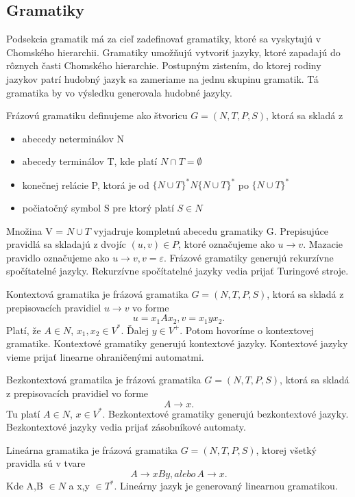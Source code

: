\subsection{Gramatiky}
Podsekcia gramatik má za cieľ zadefinovať gramatiky, ktoré sa vyskytujú v Chomského hierarchii. Gramatiky umožňujú vytvoriť jazyky, ktoré zapadajú do rôznych časti Chomského hierarchie. Postupným zistením, do ktorej rodiny jazykov patrí hudobný jazyk sa zameriame na jednu skupinu gramatik. Tá gramatika by vo výsledku generovala hudobné jazyky.

\begin{definition}
\label{def:frazgram}
Frázovú gramatiku definujeme ako štvoricu $G = (N,T,P,S)$, ktorá sa skladá z 
\begin{itemize}\itemsep0.05em
    \item abecedy neterminálov N
    \item abecedy terminálov T, kde platí $N \cap T = \emptyset$
    \item konečnej relácie P, ktorá je od $\{N \cup T\}^*N\{N \cup T\}^*$ po $\{N \cup T\}^*$
    \item počiatočný symbol S pre ktorý platí $S \in N$
\end{itemize}

Množina V = $N \cup T$ vyjadruje kompletnú abecedu gramatiky G. Prepisujúce pravidlá sa skladajú z dvojíc $(u,v) \in P$, ktoré označujeme ako $u \rightarrow v$. Mazacie pravidlo označujeme ako $u \rightarrow v, v = \varepsilon$. Frázové gramatiky generujú rekurzívne spočítatelné jazyky. Rekurzívne spočítatelné jazyky vedia prijať Turingové stroje.
\end{definition}

\begin{definition}
\label{def:kontextgram}
Kontextová gramatika je frázová gramatika $G = (N,T,P,S)$, ktorá sa skladá z prepisovacích pravidiel $u \rightarrow v$ vo forme $$u = x_1Ax_2, v = x_1yx_2.$$ Platí, že $A \in N$, $x_1, x_2 \in V^*$. Ďalej $y \in V^+$. Potom hovoríme o kontextovej gramatike. Kontextové gramatiky generujú kontextové jazyky. Kontextové jazyky vieme prijať linearne ohraničenými automatmi.
\end{definition}

\begin{definition}
\label{def:nonkontextgram}
Bezkontextová gramatika je frázová gramatika $G = (N,T,P,S)$, ktorá sa skladá z prepisovacích pravidiel vo forme $$A \rightarrow x.$$ Tu platí $A \in N$, $x \in V^*$. Bezkontextové gramatiky generujú bezkontextové jazyky. Bezkontextové jazyky vedia prijať zásobníkové automaty.
\end{definition}
\begin{definition}
\label{def:lingram}
Lineárna gramatika je frázová gramatika $G = (N,T,P,S)$, ktorej všetký pravidla sú v tvare $$A \rightarrow xBy, alebo \, A \rightarrow x.$$ Kde A,B $ \in N$ a x,y $ \in T^*$. Lineárny jazyk je generovaný linearnou gramatikou.
\end{definition}

